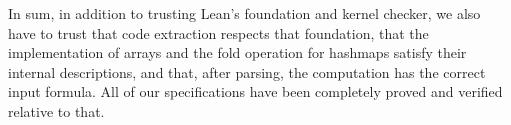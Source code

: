 In sum, in addition to trusting Lean's foundation and kernel checker,
we also have to trust that code extraction respects that foundation,
that the implementation of arrays and the fold operation for hashmaps
satisfy their internal descriptions,
and that, after parsing, the computation has the correct input formula.
All of our specifications have been completely proved and verified relative to that.

